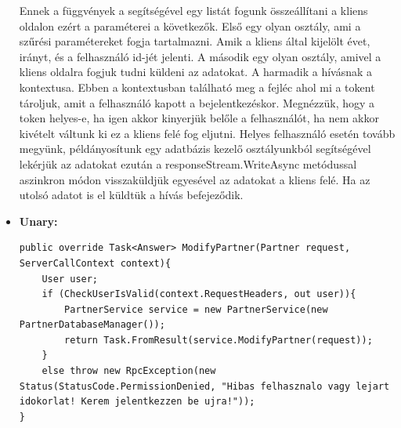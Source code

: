 \documentclass[
]{thesis-ekf}
\theoremstyle{definition}
\theoremstyle{remark}
\begin{document}
\begin{itemize}[leftmargin=0pt]
\begin{lstlisting}[showstringspaces=false,caption={Iktatások küldése a kliens számára.},captionpos=b]
	\end{lstlisting}
	Ennek a függvények a segítségével egy listát fogunk összeállítani a kliens oldalon ezért a paraméterei a következők. Első egy olyan osztály, ami a szűrési paramétereket fogja tartalmazni. Amik a kliens által kijelölt évet, irányt, és a felhasználó id-jét jelenti. A második egy olyan osztály, amivel a kliens oldalra fogjuk tudni küldeni az adatokat. A harmadik a hívásnak a kontextusa. Ebben a kontextusban található meg a fejléc ahol mi a tokent tároljuk, amit a felhasználó kapott a bejelentkezéskor. Megnézzük, hogy a token helyes-e, ha igen akkor kinyerjük belőle a felhasználót, ha nem akkor kivételt váltunk ki ez a kliens felé fog eljutni.\cite{errorhandling}  Helyes felhasználó esetén tovább megyünk, példányosítunk egy adatbázis kezelő osztályunkból segítségével lekérjük az adatokat ezután a responseStream.WriteAsync metódussal aszinkron módon visszaküldjük egyesével az adatokat a kliens felé. Ha az utolsó adatot is el küldtük a hívás befejeződik.
	\item \textbf{Unary: }
		\begin{lstlisting}[showstringspaces=false,caption={Partner módosítása.},captionpos=b]
public override Task<Answer> ModifyPartner(Partner request, ServerCallContext context){
	User user;
	if (CheckUserIsValid(context.RequestHeaders, out user)){
		PartnerService service = new PartnerService(new PartnerDatabaseManager());
		return Task.FromResult(service.ModifyPartner(request));
	}
	else throw new RpcException(new Status(StatusCode.PermissionDenied, "Hibas felhasznalo vagy lejart idokorlat! Kerem jelentkezzen be ujra!"));
}


\end{lstlisting}
\end{itemize}
\end{document}
